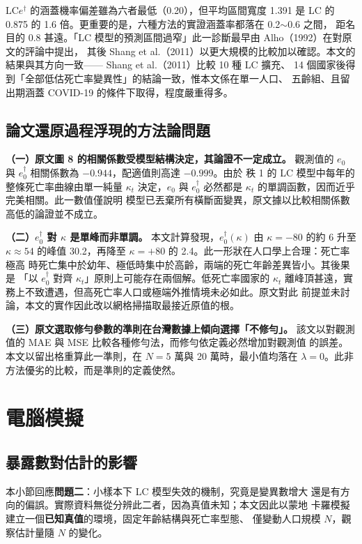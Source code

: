 \documentclass[UTF8, fontset=macnew, a4paper, 12pt]{ctexart}
\newcommand{\edag}{e_0^{\dagger}}
\newcommand{\LCe}{\mathrm{LC}e^{\dagger}}
\begin{document}
$\LCe$ 的涵蓋機率偏差雖為六者最低（0.20），但平均區間寬度 1.391 是 LC 的
0.875 的 1.6 倍。更重要的是，六種方法的實證涵蓋率都落在 0.2$\sim$0.6 之間，
距名目的 0.8 甚遠。「LC 模型的預測區間過窄」此一診斷最早由 Alho（1992）在對原文的評論中提出，
其後 Shang et al.（2011）以更大規模的比較加以確認。本文的結果與其方向一致——
Shang et al.（2011）比較 10 種 LC 擴充、
14 個國家後得到「全部低估死亡率變異性」的結論一致，惟本文係在單一人口、
五齡組、且留出期涵蓋 COVID-19 的條件下取得，程度嚴重得多。

\subsection{論文還原過程浮現的方法論問題}

\textbf{（一）原文圖 8 的相關係數受模型結構決定，其論證不一定成立。}
觀測值的 $e_0$ 與 $\edag$ 相關係數為 $-0.944$，配適值則高達 $-0.999$。由於
秩 1 的 LC 模型中每年的整條死亡率曲線由單一純量 $\kappa_t$ 決定，$e_0$ 與
$\edag$ 必然都是 $\kappa_t$ 的單調函數，因而近乎完美相關。此一數值僅說明
模型已丟棄所有橫斷面變異，原文據以比較相關係數高低的論證並不成立。

\textbf{（二）$\edag$ 對 $\kappa$ 是單峰而非單調。}
本文計算發現，$\edag(\kappa)$ 由 $\kappa=-80$ 的約 6 升至 $\kappa\approx54$
的峰值 30.2，再降至 $\kappa=+80$ 的 2.4。此一形狀在人口學上合理：死亡率極高
時死亡集中於幼年、極低時集中於高齡，兩端的死亡年齡差異皆小。其後果是
「以 $\edag$ 對齊 $\kappa_t$」原則上可能存在兩個解。低死亡率國家的 $\kappa_t$
離峰頂甚遠，實務上不致遭遇，但高死亡率人口或極端外推情境未必如此。原文對此
前提並未討論，本文的實作因此改以網格掃描取最接近原值的根。

\textbf{（三）原文選取修勻參數的準則在台灣數據上傾向選擇「不修勻」。}
該文以對觀測值的 MAE 與 MSE 比較各種修勻法，而修勻依定義必然增加對觀測值
的誤差。本文以留出格重算此一準則，在 $N=5$ 萬與 20 萬時，最小值均落在
$\lambda=0$。此非方法優劣的比較，而是準則的定義使然。

\section{電腦模擬}

\subsection{暴露數對估計的影響}

本小節回應\textbf{問題二}：小樣本下 LC 模型失效的機制，究竟是變異數增大
還是有方向的偏誤。實際資料無從分辨此二者，因為真值未知；本文因此以蒙地
卡羅模擬建立一個\textbf{已知真值}的環境，固定年齡結構與死亡率型態、
僅變動人口規模 $N$，觀察估計量隨 $N$ 的變化。
\end{document}
